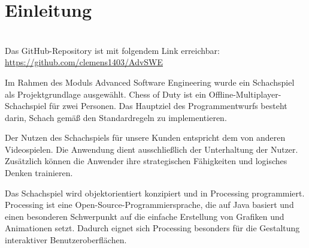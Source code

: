 \chapter{Einleitung}
\begin{balken}
    \tip
    \\
    Das GitHub-Repository ist mit folgendem Link erreichbar:\\
    \url{https://github.com/clemens1403/AdvSWE}
\end{balken}



Im Rahmen des Moduls \glqq Advanced Software Engineering\grqq{} wurde ein Schachspiel als Projektgrundlage ausgewählt. 
Chess of Duty ist ein Offline-Multiplayer-Schachspiel für zwei Personen. 
Das Hauptziel des Programmentwurfs besteht darin, Schach gemäß den Standardregeln zu implementieren. 

Der Nutzen des Schachspiels für unsere Kunden entspricht dem von anderen Videospielen. 
Die Anwendung dient ausschließlich der Unterhaltung der Nutzer. 
Zusätzlich können die Anwender ihre strategischen Fähigkeiten und logisches Denken trainieren.

Das Schachspiel wird objektorientiert konzipiert und in Processing programmiert. 
Processing ist eine Open-Source-Programmiersprache, die auf Java basiert und einen besonderen Schwerpunkt auf die einfache Erstellung von Grafiken und Animationen setzt. 
Dadurch eignet sich Processing besonders für die Gestaltung interaktiver Benutzeroberflächen. 